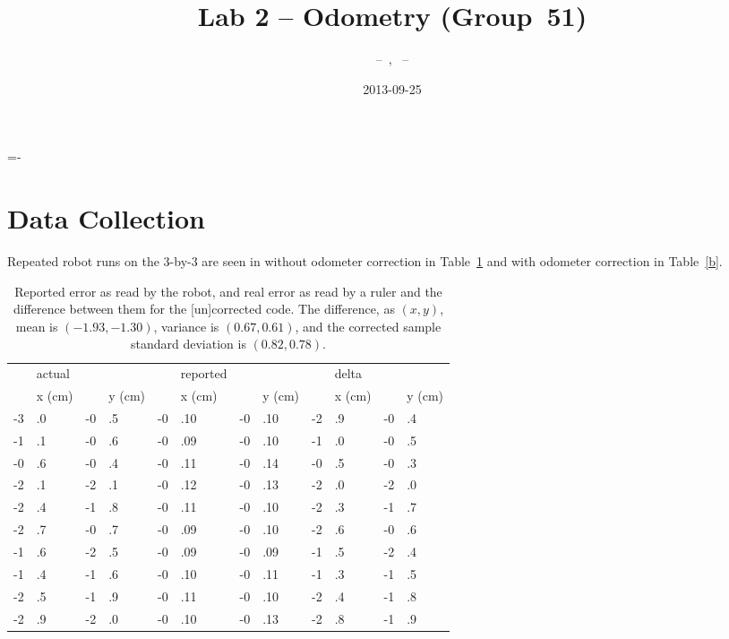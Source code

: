 \documentclass[twocolumn]{article}
\author{\bname~--~\bid, \name~--~\id}
\title{Lab 2 -- Odometry (Group~51)}
\date{2013-09-25}
\begin{document}
\abovedisplayskip=-\baselineskip

\maketitle



\section{Data Collection}

Repeated robot runs on the 3-by-3 are seen in without odometer correction in Table~\ref{a} and with odometer correction in Table~\ref{b}.

\begin{table*}[htb]
\begin{center}\begin{tabular}{r@{}l r@{}l r@{}l r@{}l r@{}l r@{}l}
&actual&&& &reported&&& &delta&& \\
&x (cm)& &y (cm)& &x (cm)& &y (cm)& &x (cm)& &y (cm) \\
\hline
-3&.0& -0&.5& -0&.10& -0&.10& -2&.9& -0&.4 \\
-1&.1& -0&.6& -0&.09& -0&.10& -1&.0& -0&.5 \\
-0&.6& -0&.4& -0&.11& -0&.14& -0&.5& -0&.3 \\
-2&.1& -2&.1& -0&.12& -0&.13& -2&.0& -2&.0 \\
-2&.4& -1&.8& -0&.11& -0&.10& -2&.3& -1&.7 \\
-2&.7& -0&.7& -0&.09& -0&.10& -2&.6& -0&.6 \\
-1&.6& -2&.5& -0&.09& -0&.09& -1&.5& -2&.4 \\
-1&.4& -1&.6& -0&.10& -0&.11& -1&.3& -1&.5 \\
-2&.5& -1&.9& -0&.11& -0&.10& -2&.4& -1&.8 \\
-2&.9& -2&.0& -0&.10& -0&.13& -2&.8& -1&.9 \\
\end{tabular}\end{center}
\caption{Reported error as read by the robot, and real error as read by a ruler and the difference between them for the [un]corrected code.
The difference, as $(x, y)$, mean is $(-1.93, -1.30)$, variance is $(0.67, 0.61)$, and the corrected sample standard deviation is $(0.82, 0.78)$.}
\label{a}
\end{table*}
\end{document}
